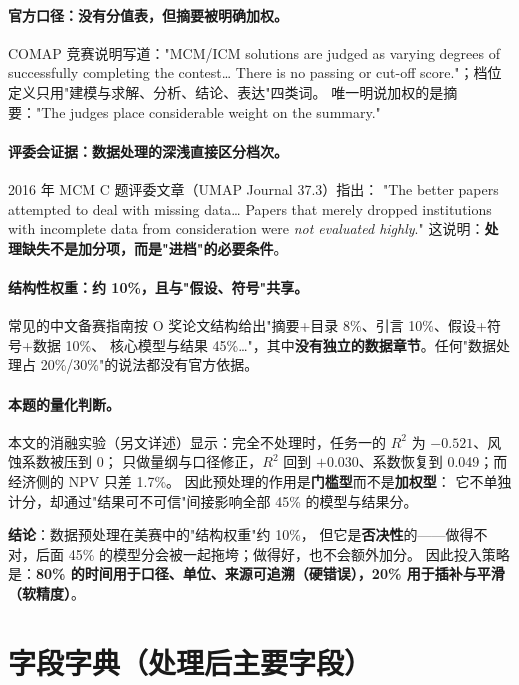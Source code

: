 \documentclass[11pt,a4paper]{ctexart}
\begin{document}
\paragraph{官方口径：没有分值表，但摘要被明确加权。}
COMAP 竞赛说明写道："MCM/ICM solutions are judged as varying degrees of successfully completing the contest…
There is no passing or cut-off score."；档位定义只用"建模与求解、分析、结论、表达"四类词。
唯一明说加权的是摘要："The judges place considerable weight on the summary."

\paragraph{评委会证据：数据处理的深浅直接区分档次。}
2016 年 MCM C 题评委文章（UMAP Journal 37.3）指出：
"The better papers attempted to deal with missing data… Papers that merely dropped institutions with
incomplete data from consideration were \emph{not evaluated highly}."
这说明：\textbf{处理缺失不是加分项，而是"进档"的必要条件}。

\paragraph{结构性权重：约 10\%，且与"假设、符号"共享。}
常见的中文备赛指南按 O 奖论文结构给出"摘要+目录 8\%、引言 10\%、假设+符号+数据 10\%、
核心模型与结果 45\%…"，其中\textbf{没有独立的数据章节}。任何"数据处理占 20\%/30\%"的说法都没有官方依据。

\paragraph{本题的量化判断。}
本文的消融实验（另文详述）显示：完全不处理时，任务一的 $R^2$ 为 $-0.521$、风蚀系数被压到 0；
只做量纲与口径修正，$R^2$ 回到 $+0.030$、系数恢复到 0.049；而经济侧的 NPV 只差 1.7\%。
因此预处理的作用是\textbf{门槛型}而不是\textbf{加权型}：
它不单独计分，却通过"结果可不可信"间接影响全部 45\% 的模型与结果分。

\noindent\textbf{结论}：数据预处理在美赛中的"结构权重"约 10\%，
但它是\textbf{否决性}的——做得不对，后面 45\% 的模型分会被一起拖垮；做得好，也不会额外加分。
因此投入策略是：\textbf{80\% 的时间用于口径、单位、来源可追溯（硬错误），20\% 用于插补与平滑（软精度）}。

\appendix
\section{字段字典（处理后主要字段）}
\end{document}
